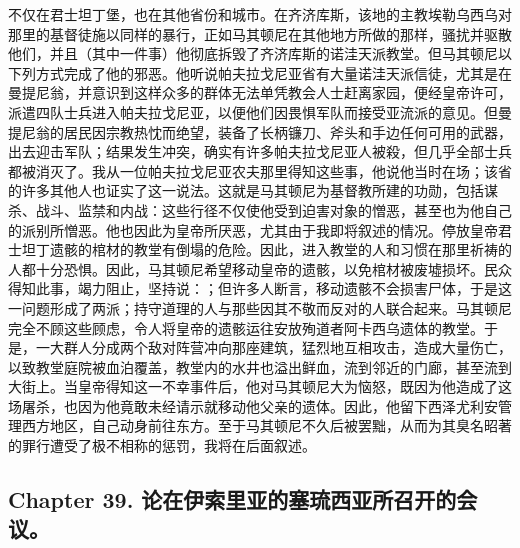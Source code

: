 不仅在君士坦丁堡，也在其他省份和城市。在齐济库斯，该地的主教埃勒乌西乌对那里的基督徒施以同样的暴行，正如马其顿尼在其他地方所做的那样，骚扰并驱散他们，并且（其中一件事）他彻底拆毁了齐济库斯的诺洼天派教堂。但马其顿尼以下列方式完成了他的邪恶。他听说帕夫拉戈尼亚省有大量诺洼天派信徒，尤其是在曼提尼翁，并意识到这样众多的群体无法单凭教会人士赶离家园，便经皇帝许可，派遣四队士兵进入帕夫拉戈尼亚，以便他们因畏惧军队而接受亚流派的意见。但曼提尼翁的居民因宗教热忱而绝望，装备了长柄镰刀、斧头和手边任何可用的武器，出去迎击军队；结果发生冲突，确实有许多帕夫拉戈尼亚人被殺，但几乎全部士兵都被消灭了。我从一位帕夫拉戈尼亚农夫那里得知这些事，他说他当时在场；该省的许多其他人也证实了这一说法。这就是马其顿尼为基督教所建的功勋，包括谋杀、战斗、监禁和内战：这些行径不仅使他受到迫害对象的憎恶，甚至也为他自己的派别所憎恶。他也因此为皇帝所厌恶，尤其由于我即将叙述的情况。停放皇帝君士坦丁遗骸的棺材的教堂有倒塌的危险。因此，进入教堂的人和习惯在那里祈祷的人都十分恐惧。因此，马其顿尼希望移动皇帝的遗骸，以免棺材被废墟损坏。民众得知此事，竭力阻止，坚持说：；但许多人断言，移动遗骸不会损害尸体，于是这一问题形成了两派；持守道理的人与那些因其不敬而反对的人联合起来。马其顿尼完全不顾这些顾虑，令人将皇帝的遗骸运往安放殉道者阿卡西乌遗体的教堂。于是，一大群人分成两个敌对阵营冲向那座建筑，猛烈地互相攻击，造成大量伤亡，以致教堂庭院被血泊覆盖，教堂内的水井也溢出鲜血，流到邻近的门廊，甚至流到大街上。当皇帝得知这一不幸事件后，他对马其顿尼大为恼怒，既因为他造成了这场屠杀，也因为他竟敢未经请示就移动他父亲的遗体。因此，他留下西泽尤利安管理西方地区，自己动身前往东方。至于马其顿尼不久后被罢黜，从而为其臭名昭著的罪行遭受了极不相称的惩罚，我将在后面叙述。\par


\subsection{Chapter 39. 论在伊索里亚的塞琉西亚所召开的会议。}

